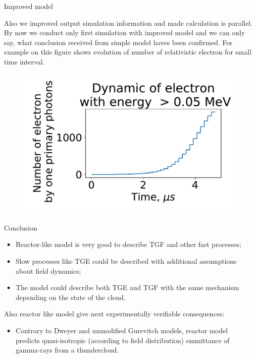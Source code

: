 \documentclass[final,hyperref={pdfpagelabels=false}]{beamer}
\begin{document}
\begin{frame}{}
\begin{columns}[t]
\begin{column}{0.32\linewidth}
\begin{block}{Improved model}
\begin{itemize}
				\end{itemize}
            Also we improved output simulation information and made calculation is parallel.
            By now we conduct only first simulation with improved model and we can only say, what conclusion received from simple model  haves been confirmed. For example on this figure shows evolution of  number of relativistic electron for small time interval.
				                         \begin{figure}[htb]
                             \centering
                             \includegraphics[width=1\columnwidth]{kotlinElectron.pdf}
                          
                         \end{figure}
         
				                    
				                    
				                    
			\end{block}
			                
			\begin{block}{Conclusion}
               
				\begin{itemize}
                    \item Reactor-like model is very good to describe TGF and other fast processes;
                    \item Slow processes like TGE could be described with additional assumptions about field dynamics;
                    \item The model could describe both TGE and TGF with the same mechanism depending on the state of the cloud.
				\end{itemize}
				Also reactor like model give next experimentally verifiable consequences:
                \begin{itemize}
                    \item Contrary to Dweyer and unmodified Gurevitch models, reactor model predicts quasi-isotropic (according to field distribution) emmittance of gamma-rays from a thundercloud.
            

\end{itemize}
\end{block}
\end{column}
\end{columns}
\end{frame}
\end{document}

